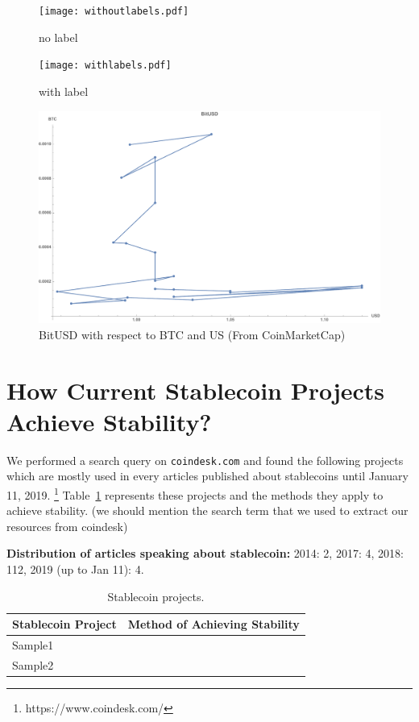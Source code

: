 \begin{figure}[!htb]
	\texttt{[image: withoutlabels.pdf]}
	\caption{no label}\label{fig:cad1}
	\endminipage\hfill
	\texttt{[image: withlabels.pdf]}
	\caption{with label}\label{fig:eur1}
	\endminipage\hfill
	\includegraphics[width=\linewidth]{figures/BitUSD_CoinMarket.pdf}
	\caption{BitUSD with respect to BTC and US (From CoinMarketCap)}\label{fig:bitusd3}
	\endminipage\hfill
\end{figure}

\section{How Current Stablecoin Projects  Achieve Stability?}
We performed a search query on \texttt{coindesk.com} and found the following projects which are mostly used in every articles published about stablecoins until January 11, 2019. \footnote{https://www.coindesk.com/} Table~\ref{tab:stablecoins} represents these projects and the methods they apply to achieve stability. (we should mention the search term that we used to extract our resources from coindesk)


\textbf{Distribution of articles speaking about stablecoin:} 2014: 2, 2017: 4, 2018: 112, 2019 (up to Jan 11): 4.

\begin{table}[t]
\centering
\begin{tabular}{|l|l|}  
\hline
\textbf{Stablecoin Project} & \textbf{Method of Achieving Stability}   \\ \hline
Sample1 & \\ \hline
Sample2 & \\
\hline
\end{tabular}
\caption{\footnotesize{Stablecoin projects.}\label{tab:stablecoins}}
\end{table}




